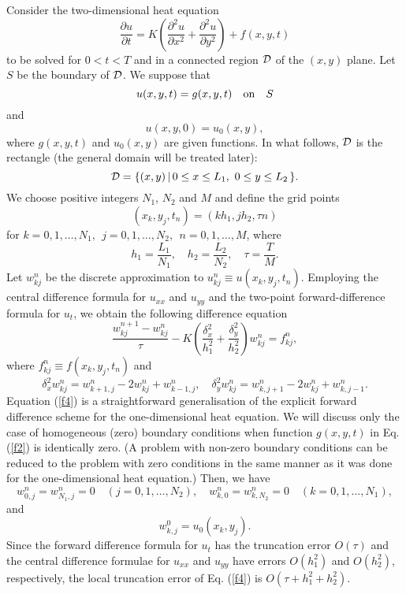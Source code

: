 Consider the two-dimensional heat equation
\begin{equation}
\frac{\partial u}{\partial t}=K\left(\frac{\partial^{2}u}{\partial
x^{2}} +\frac{\partial^{2}u}{\partial y^{2}}\right)+f(x,y,t) \label{f1}
\end{equation}
to be solved for $0 < t < T$ and in a connected region ${\cal D}$ of
the $(x, y)$ plane. Let $S$ be the boundary of ${\cal D}$. We
suppose that
\begin{equation}
u(x, y, t) = g(x, y, t) \quad {\rm on} \quad S \label{f2}
\end{equation}
and
\begin{equation}
u(x, y, 0) = u_{0}(x, y), \label{f3}
\end{equation}
where $g(x, y, t)$ and $ u_{0}(x, y)$ are given functions.
In what follows, ${\cal D}$ is the rectangle (the general domain
will be treated later):
\[
{\cal D}=\{(x,y) \, \vert \, 0\leq x\leq L_{1}, \ 0\leq y\leq L_{2}  \, \}.
\]
We choose positive integers $N_{1}$, $N_{2}$ and
$M$ and define the grid points
\[
(x_{k},y_{j},t_{n})=(kh_{1},jh_{2}, \tau n)
\]
for $k=0,1,\dots, N_{1}, \ \ j=0,1,\dots, N_{2}, \ \ n=0,1,\dots, M$,
where
\[
h_{1}=\frac{L_{1}}{N_{1}}, \quad h_{2}=\frac{L_{2}}{N_{2}}, \quad
\tau=\frac{T}{M}.
\]
Let $w_{kj}^{n}$ be the discrete approximation to
$u_{kj}^n\equiv u(x_{k},y_{j},t_{n})$. Employing the central
difference formula for $u_{xx}$ and $u_{yy}$
and the two-point forward-difference formula for $u_t$, we
obtain the following difference equation
\begin{equation}
\frac{w_{kj}^{n+1}-w_{kj}^{n}}{\tau} -K\left(\frac{\delta_{x}^2}{h_{1}^2}
+\frac{\delta_{y}^2}{h_{2}^2}\right)w_{kj}^{n}=f_{kj}^n, \label{f4}
\end{equation}
where $f_{kj}^n\equiv f(x_{k},y_{j},t_{n})$ and
\[
\delta_{x}^2w_{kj}^{n}=w_{k+1,j}^{n}-2w_{kj}^{n}+w_{k-1,j}^{n}, \quad
\delta_{y}^2w_{kj}^{n}=w_{k,j+1}^{n}-2w_{kj}^{n}+w_{k,j-1}^{n}.
\]
Equation (\ref{f4})
is a straightforward generalisation of the explicit forward difference
scheme for the one-dimensional heat equation. We will discuss only
the case of homogeneous (zero) boundary conditions when function
$g(x,y,t)$ in Eq. (\ref{f2}) is identically zero. (A problem with
non-zero boundary conditions can be reduced to the problem with
zero conditions in the same manner as it was done for the one-dimensional
heat equation.) Then, we have
\begin{equation}
w_{0,j}^{n}=w^{n}_{N_{1},j}=0 \quad
(j=0,1,\dots, N_{2}), \quad
w^{n}_{k,0}=w^{n}_{k,N_{2}}=0 \quad
(k=0,1,\dots, N_{1}), \label{f5}
\end{equation}
and
\begin{equation}
w^{0}_{k,j}=u_{0}(x_{k},y_{j}). \label{f6}
\end{equation}
Since the forward difference formula for $u_t$ has the truncation error
$O(\tau)$ and the central
difference formulae for
$u_{xx}$ and $u_{yy}$ have errors $O(h_{1}^2)$ and $O(h_{2}^2)$, respectively, the
local truncation error of Eq. (\ref{f4}) is $O(\tau+h_{1}^2+h_{2}^2)$.

